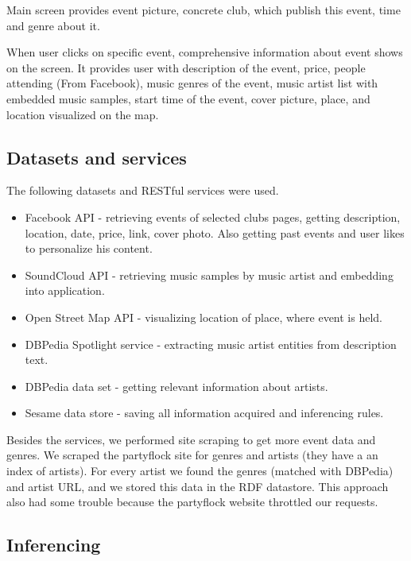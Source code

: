 \documentclass[12pt, a4paper, lithuanian]{article}
\begin{document}
  Main screen provides event picture, concrete club, which publish this event, time and genre about it.

  When user clicks on specific event, comprehensive information about event shows on the screen. It provides user with description of the event, price, people attending (From Facebook), music genres of the event, music artist list with embedded music samples, start time of the event, cover picture, place, and location visualized on the map.

\subsection{Datasets and services}

  The following datasets and RESTful services were used.

\begin{itemize}

  \item Facebook API - retrieving events of selected clubs pages, getting description, location, date, price, link, cover photo. Also getting past events and user likes to personalize his content.

  \item SoundCloud API - retrieving music samples by music artist and embedding into application.

  \item Open Street Map API - visualizing location of place, where event is held.

  \item DBPedia Spotlight service - extracting music artist entities from description text.

  \item DBPedia data set - getting relevant information about artists.

  \item Sesame data store - saving all information acquired and inferencing rules.

\end{itemize}

Besides the services, we performed site scraping to get more event data and genres. We scraped the partyflock site for genres and artists (they have a an index of artists). For every artist we found the genres (matched with DBPedia) and artist URL, and we stored this data in the RDF datastore. This approach also had some trouble because the partyflock website throttled our requests.

\subsection{Inferencing}
\end{document}
